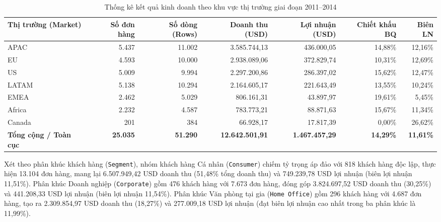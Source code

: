 \begin{table}[H]
\centering
\caption{Thống kê kết quả kinh doanh theo khu vực thị trường giai đoạn 2011--2014}
\label{tab:eda_market}
\small
\renewcommand{\arraystretch}{1.25}
\begin{tabularx}{\textwidth}{|l|r|r|r|r|r|r|}
\hline
\textbf{Thị trường (Market)} & \textbf{Số đơn hàng} & \textbf{Số dòng (Rows)} & \textbf{Doanh thu (USD)} & \textbf{Lợi nhuận (USD)} & \textbf{Chiết khấu BQ} & \textbf{Biên LN} \\
\hline
APAC & 5.437 & 11.002 & 3.585.744,13 & 436.000,05 & 14,88\% & 12,16\% \\
\hline
EU & 4.593 & 10.000 & 2.938.089,06 & 372.829,74 & 10,31\% & 12,69\% \\
\hline
US & 5.009 & 9.994 & 2.297.200,86 & 286.397,02 & 15,62\% & 12,47\% \\
\hline
LATAM & 5.138 & 10.294 & 2.164.605,17 & 221.643,49 & 13,55\% & 10,24\% \\
\hline
EMEA & 2.462 & 5.029 & 806.161,31 & 43.897,97 & 19,61\% & 5,45\% \\
\hline
Africa & 2.232 & 4.587 & 783.773,21 & 88.871,63 & 15,67\% & 11,34\% \\
\hline
Canada & 201 & 384 & 66.928,17 & 17.817,39 & 0,00\% & 26,62\% \\
\hline
\textbf{Tổng cộng / Toàn cục} & \textbf{25.035} & \textbf{51.290} & \textbf{12.642.501,91} & \textbf{1.467.457,29} & \textbf{14,29\%} & \textbf{11,61\%} \\
\hline
\end{tabularx}
\end{table}

Xét theo phân khúc khách hàng (\texttt{Segment}), nhóm khách hàng Cá nhân (\texttt{Consumer}) chiếm tỷ trọng áp đảo với 818 khách hàng độc lập, thực hiện 13.104 đơn hàng, mang lại 6.507.949,42 USD doanh thu (51,48\% tổng doanh thu) và 749.239,78 USD lợi nhuận (biên lợi nhuận 11,51\%). Phân khúc Doanh nghiệp (\texttt{Corporate}) gồm 476 khách hàng với 7.673 đơn hàng, đóng góp 3.824.697,52 USD doanh thu (30,25\%) và 441.208,33 USD lợi nhuận (biên lợi nhuận 11,54\%). Phân khúc Văn phòng tại gia (\texttt{Home Office}) gồm 296 khách hàng với 4.687 đơn hàng, tạo ra 2.309.854,97 USD doanh thu (18,27\%) và 277.009,18 USD lợi nhuận (đạt biên lợi nhuận cao nhất trong ba phân khúc là 11,99\%).

